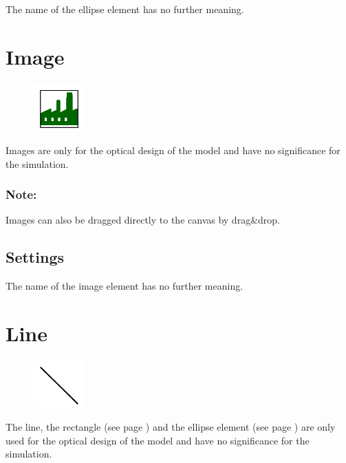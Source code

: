 The name of the ellipse element has no further meaning.


\section{Image}
\label{ref:ModelElementImage}

\begin{figure}
\vspace{-22pt}
\includegraphics[width=2cm]{imageModelElementImage.png}
\vspace{-22pt}
\end{figure}

Images are only for the optical design of the model and have no significance for the simulation.

\subsubsection*{Note:}

Images can also be dragged directly to the canvas by drag\&drop.

\subsection*{Settings}

The name of the image element has no further meaning.


\section{Line}
\label{ref:ModelElementLine}

\begin{figure}
\vspace{-22pt}
\includegraphics[width=2cm]{imageModelElementLine.png}
\vspace{-22pt}
\end{figure}

The line, the rectangle (see page \pageref{ref:ModelElementRectangle}) and the
ellipse element (see page \pageref{ref:ModelElementEllipse}) 
are only used for the optical design of the model and have no significance for the simulation.

